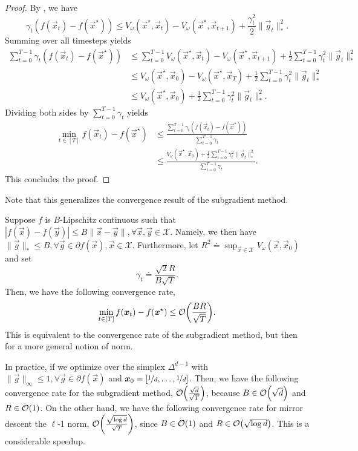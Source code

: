 \begin{proof}
    By , we have \[
        \gamma_t (f(\vec{x}_t) - f(\vec{x}^\star)) \leq V_{\omega}(\vec{x}^\star, \vec{x}_t) - V_{\omega}(\vec{x}^\star, \vec{x}_{t+1}) + \frac{\gamma_t^2}{2} \| \vec{g}_t \|_*^2.
    \]
    Summing over all timesteps yields
    \begin{align*}
        \sum_{t=0}^{T-1} \gamma_t (f(\vec{x}_t) - f(\vec{x}^\star)) & \leq \sum_{t=0}^{T-1} V_{\omega}(\vec{x}^\star, \vec{x}_t) - V_{\omega}(\vec{x}^\star, \vec{x}_{t+1}) + \frac{1}{2} \sum_{t=0}^{T-1} \gamma_t^2 \| \vec{g}_t \|_*^2 \\
                                                                    & \leq V_{\omega}(\vec{x}^\star, \vec{x}_0) - V_{\omega}(\vec{x}^\star, \vec{x}_T) + \frac{1}{2} \sum_{t=0}^{T-1} \gamma_t^2 \| \vec{g}_t \|_*^2 \\
                                                                    & \leq V_{\omega}(\vec{x}^\star, \vec{x}_0) + \frac{1}{2} \sum_{t=0}^{T-1} \gamma_t^2 \| \vec{g}_t \|_*^2.
    \end{align*}
    Dividing both sides by $\sum_{t=0}^{T-1} \gamma_t$ yields
    \begin{align*}
        \min_{t \in [T]} f(\vec{x}_t) - f(\vec{x}^\star) & \leq \frac{\sum_{t=0}^{T-1} \gamma_t (f(\vec{x}_t) - f(\vec{x}^\star))}{\sum_{t=0}^{T-1} \gamma_t} \\
                                                         & \leq \frac{V_{\omega}(\vec{x}^\star, \vec{x}_0) + \frac{1}{2} \sum_{t=0}^{T-1} \gamma_t^2 \| \vec{g}_t \|_*^2}{\sum_{t=0}^{T-1} \gamma_t}.
    \end{align*}
    This concludes the proof.
\end{proof}

Note that this generalizes the convergence result of the subgradient method.

Suppose $f$ is $B$-Lipschitz continuous such that $| f(\vec{x}) - f(\vec{y}) | \leq B \| \vec{x} -
    \vec{y} \|, \forall \vec{x}, \vec{y} \in \mathcal{X}$. Namely, we then have $\| \vec{g} \|_* \leq
    B, \forall \vec{g} \in \partial f(\vec{x}), \vec{x} \in \mathcal{X}$. Furthermore, let $R^2 \doteq
    \sup_{\vec{x} \in \mathcal{X}} V_{\omega}(\vec{x}, \vec{x}_0)$ and set \[
    \gamma_t \doteq \frac{\sqrt{2} R}{B \sqrt{T}}.
\]
Then, we have the following convergence rate, \[
    \min_{t \in [T]} f(\vec{x}_t) - f(\vec{x}^\star) \leq \bigo{\frac{BR}{\sqrt{T}}}.
\]
This is equivalent to the convergence rate of the subgradient method, but then for a more general
notion of norm.

In practice, if we optimize over the simplex $\Delta^{d-1}$ with $\| \vec{g} \|_\infty \leq 1,
    \forall \vec{g} \in \partial f(\vec{x})$ and $\vec{x}_0 = [\nicefrac{1}{d}, \ldots,
    \nicefrac{1}{d}]$. Then, we have the following convergence rate for the subgradient method,
$\bigo{\frac{\sqrt{d}}{\sqrt{T}}}$, because $B \in \bigo{\sqrt{d}}$ and $R \in \bigo{1}$. On the
other hand, we have the following convergence rate for mirror descent \wrt the $\ell$-1 norm,
$\bigo{\frac{\sqrt{\log d}}{\sqrt{T}}}$, since $B \in \bigo{1}$ and $R \in \bigo{\sqrt{\log d}}$.
This is a considerable speedup.
